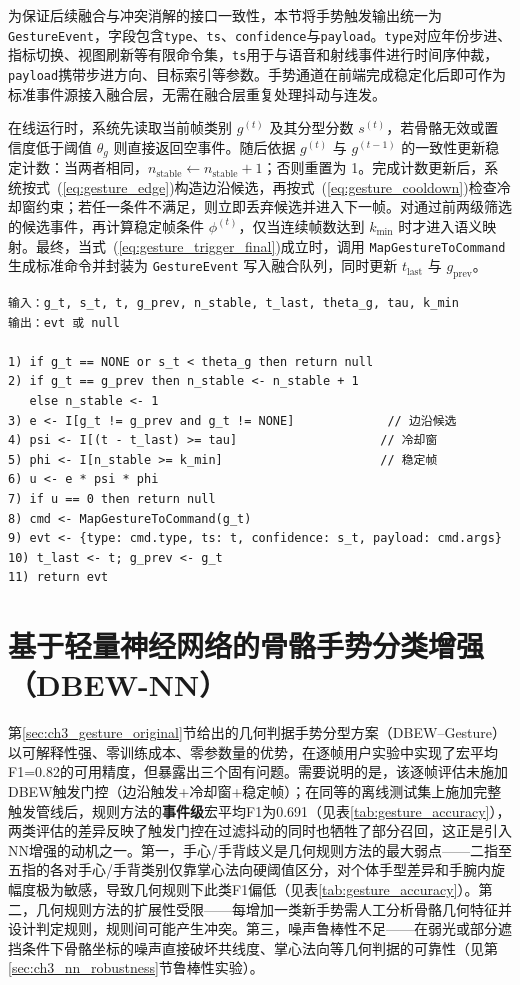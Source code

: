 为保证后续融合与冲突消解的接口一致性，本节将手势触发输出统一为\texttt{GestureEvent}，字段包含\texttt{type}、\texttt{ts}、\texttt{confidence}与\texttt{payload}。\texttt{type}对应年份步进、指标切换、视图刷新等有限命令集，\texttt{ts}用于与语音和射线事件进行时间序仲裁，\texttt{payload}携带步进方向、目标索引等参数。手势通道在前端完成稳定化后即可作为标准事件源接入融合层，无需在融合层重复处理抖动与连发。

在线运行时，系统先读取当前帧类别 $g^{(t)}$ 及其分型分数 $s^{(t)}$，若骨骼无效或置信度低于阈值 $\theta_g$ 则直接返回空事件。随后依据 $g^{(t)}$ 与 $g^{(t-1)}$ 的一致性更新稳定计数：当两者相同，$n_{\mathrm{stable}} \leftarrow n_{\mathrm{stable}}+1$；否则重置为 1。完成计数更新后，系统按式~(\ref{eq:gesture_edge})构造边沿候选，再按式~(\ref{eq:gesture_cooldown})检查冷却窗约束；若任一条件不满足，则立即丢弃候选并进入下一帧。对通过前两级筛选的候选事件，再计算稳定帧条件 $\phi^{(t)}$，仅当连续帧数达到 $k_{\min}$ 时才进入语义映射。最终，当式~(\ref{eq:gesture_trigger_final})成立时，调用 \texttt{MapGestureToCommand} 生成标准命令并封装为 \texttt{GestureEvent} 写入融合队列，同时更新 $t_{\mathrm{last}}$ 与 $g_{\mathrm{prev}}$。
\clearpage
\begin{lstlisting}[caption={边沿触发与时间窗抑制在线判定伪代码},label={lst:edge_window_online},captionpos=t]
输入：g_t, s_t, t, g_prev, n_stable, t_last, theta_g, tau, k_min
输出：evt 或 null

1) if g_t == NONE or s_t < theta_g then return null
2) if g_t == g_prev then n_stable <- n_stable + 1
   else n_stable <- 1
3) e <- I[g_t != g_prev and g_t != NONE]             // 边沿候选
4) psi <- I[(t - t_last) >= tau]                    // 冷却窗
5) phi <- I[n_stable >= k_min]                      // 稳定帧
6) u <- e * psi * phi
7) if u == 0 then return null
8) cmd <- MapGestureToCommand(g_t)
9) evt <- {type: cmd.type, ts: t, confidence: s_t, payload: cmd.args}
10) t_last <- t; g_prev <- g_t
11) return evt
\end{lstlisting}

\section{基于轻量神经网络的骨骼手势分类增强（DBEW-NN）}
\label{sec:ch3_gesture_nn}


第\ref{sec:ch3_gesture_original}节给出的几何判据手势分型方案（DBEW--Gesture）以可解释性强、零训练成本、零参数量的优势，在逐帧用户实验中实现了宏平均F1=0.82的可用精度，但暴露出三个固有问题。需要说明的是，该逐帧评估未施加DBEW触发门控（边沿触发+冷却窗+稳定帧）；在同等的离线测试集上施加完整触发管线后，规则方法的\textbf{事件级}宏平均F1为0.691（见表\ref{tab:gesture_accuracy}），两类评估的差异反映了触发门控在过滤抖动的同时也牺牲了部分召回，这正是引入NN增强的动机之一。第一，手心/手背歧义是几何规则方法的最大弱点——二指至五指的各对手心/手背类别仅靠掌心法向硬阈值区分，对个体手型差异和手腕内旋幅度极为敏感，导致几何规则下此类F1偏低（见表\ref{tab:gesture_accuracy}）。第二，几何规则方法的扩展性受限——每增加一类新手势需人工分析骨骼几何特征并设计判定规则，规则间可能产生冲突。第三，噪声鲁棒性不足——在弱光或部分遮挡条件下骨骼坐标的噪声直接破坏共线度、掌心法向等几何判据的可靠性（见第\ref{sec:ch3_nn_robustness}节鲁棒性实验）。

